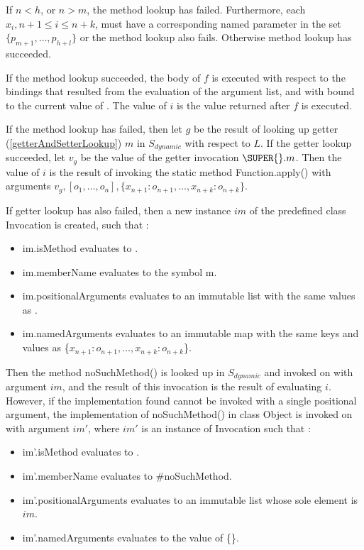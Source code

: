 \documentclass{article}
\newcommand{\code}[1]{{\sf #1}}
\begin{document}
\LMHash{}
If  $n < h$, or $n > m$, the method lookup has failed. Furthermore, each $x_i, n+1 \le i \le n+k$,  must have a corresponding named parameter in the set $\{p_{m+1}, \ldots, p_{h+l}\}$ or the method lookup also fails.  Otherwise method lookup has succeeded.

\LMHash{}
If the method lookup succeeded, the body of $f$ is executed with respect to the bindings that resulted from the evaluation of the argument list, and with \THIS{} bound to the current value of \THIS{}. The value of $i$ is the value returned after $f$ is executed.

\LMHash{}
If the method lookup has failed, then let $g$ be the result of looking up getter (\ref{getterAndSetterLookup}) $m$ in $S_{dynamic}$ with respect to $L$. If the getter lookup succeeded, let $v_g$ be the value of the getter invocation $\SUPER{}.m$. Then the value of $i$ is the result of invoking 
the static method \code{Function.apply()} with arguments $v_g, [o_1, \ldots , o_n], \{x_{n+1}: o_{n+1}, \ldots , x_{n+k}: o_{n+k}\}$.
 
\LMHash{}
If  getter lookup has also failed, then a new instance $im$  of the predefined class  \code{Invocation}  is created, such that :
\begin{itemize}
\item  \code{im.isMethod} evaluates to \code{\TRUE{}}.
\item  \code{im.memberName} evaluates to the symbol \code{m}.
\item \code{im.positionalArguments} evaluates to an immutable list with the same  values as  \code{[$o_1, \ldots, o_n$]}.
\item \code{im.namedArguments} evaluates to an immutable map with the same keys and values as \code{\{$x_{n+1}: o_{n+1}, \ldots, x_{n+k} : o_{n+k}$\}}.
\end{itemize}
Then the method \code{noSuchMethod()} is looked up in $S_{dynamic}$ and invoked on \THIS{} with argument $im$, and the result of this invocation is the result of evaluating $i$. However, if the implementation found cannot be invoked with a single positional argument, the implementation  of \code{noSuchMethod()} in class \code{Object} is invoked on \THIS{} with argument $im'$, where $im'$ is an instance of \code{Invocation} such that :
\begin{itemize}
\item  \code{im'.isMethod} evaluates to \code{\TRUE{}}.
\item  \code{im'.memberName} evaluates to \code{\#noSuchMethod}.
\item \code{im'.positionalArguments} evaluates to an immutable list whose sole element is  $im$.
\item \code{im'.namedArguments} evaluates to the value of \code{\CONST{} \{\}}.
\end{itemize}
\end{document}
